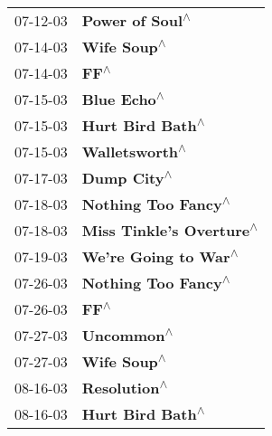 \begin{supertabular}{p{0.25\columnwidth}p{0.75\columnwidth}}
 07-12-03 &                                                            \textbf{Power of Soul\textsuperscript{$\wedge$}} \\
 07-14-03 &                                                                \textbf{Wife Soup\textsuperscript{$\wedge$}} \\
 07-14-03 &                                                                       \textbf{FF\textsuperscript{$\wedge$}} \\
 07-15-03 &                                                                \textbf{Blue Echo\textsuperscript{$\wedge$}} \\
 07-15-03 &                                                           \textbf{Hurt Bird Bath\textsuperscript{$\wedge$}} \\
 07-15-03 &                                                             \textbf{Walletsworth\textsuperscript{$\wedge$}} \\
 07-17-03 &                                                                \textbf{Dump City\textsuperscript{$\wedge$}} \\
 07-18-03 &                                                        \textbf{Nothing Too Fancy\textsuperscript{$\wedge$}} \\
 07-18-03 &                                                   \textbf{Miss Tinkle's Overture\textsuperscript{$\wedge$}} \\
 07-19-03 &                                                       \textbf{We're Going to War\textsuperscript{$\wedge$}} \\
 07-26-03 &                                                        \textbf{Nothing Too Fancy\textsuperscript{$\wedge$}} \\
 07-26-03 &                                                                       \textbf{FF\textsuperscript{$\wedge$}} \\
 07-27-03 &                                                                 \textbf{Uncommon\textsuperscript{$\wedge$}} \\
 07-27-03 &                                                                \textbf{Wife Soup\textsuperscript{$\wedge$}} \\
 08-16-03 &                                                               \textbf{Resolution\textsuperscript{$\wedge$}} \\
 08-16-03 &                                                           \textbf{Hurt Bird Bath\textsuperscript{$\wedge$}} \\

\end{supertabular}
